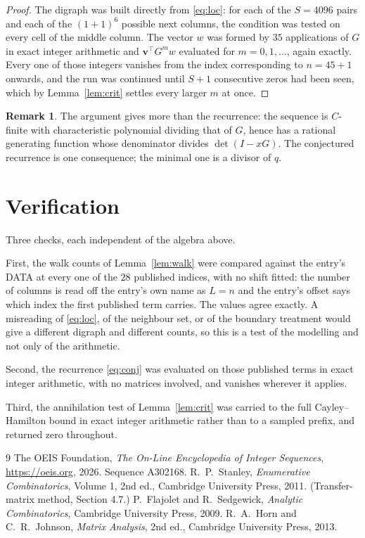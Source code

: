 \documentclass[11pt,a4paper]{article}
\theoremstyle{plain}
\theoremstyle{definition}
\newtheorem{remark}[theorem]{Remark}
\begin{document}
\begin{proof}
The digraph was built directly from \eqref{eq:loc}: for each of the $S=4096$ pairs and each
of the $(1+1)^{6}$ possible next columns, the condition was tested on every cell of
the middle column. The vector $w$ was formed by $35$ applications of $G$ in exact integer
arithmetic and $\mathbf{v}^{\!\top}G^{m}w$ evaluated for $m=0,1,\dots$, again exactly.
Every one of those integers vanishes from the index corresponding to $n=45+1$ onwards,
and the run was continued until $S+1$ consecutive zeros had been seen, which by
Lemma~\ref{lem:crit} settles every larger $m$ at once.
\end{proof}

\begin{remark}
The argument gives more than the recurrence: the sequence is $C$-finite with characteristic
polynomial dividing that of $G$, hence has a rational generating function whose denominator
divides $\det(I-xG)$. The conjectured recurrence is one consequence; the minimal one is a
divisor of $q$.
\end{remark}

\section{Verification}

Three checks, each independent of the algebra above.

First, the walk counts of Lemma~\ref{lem:walk} were compared against the entry's DATA at
every one of the $28$ published indices, with no shift fitted: the number of columns is
read off the entry's own name as $L=n$ and the entry's offset says which index the first
published term carries. The values agree exactly. A misreading of \eqref{eq:loc}, of the
neighbour set, or of the boundary treatment would give a different digraph and different
counts, so this is a test of the modelling and not only of the arithmetic.

Second, the recurrence \eqref{eq:conj} was evaluated on those published terms in exact
integer arithmetic, with no matrices involved, and vanishes wherever it applies.

Third, the annihilation test of Lemma~\ref{lem:crit} was carried to the full
Cayley--Hamilton bound in exact integer arithmetic rather than to a sampled prefix, and
returned zero throughout.

\begin{thebibliography}{9}
 The OEIS Foundation, \emph{The On-Line Encyclopedia of Integer
Sequences}, \url{https://oeis.org}, 2026. Sequence A302168.
 R.~P.~Stanley, \emph{Enumerative Combinatorics}, Volume 1, 2nd ed.,
Cambridge University Press, 2011. (Transfer-matrix method, Section 4.7.)
 P.~Flajolet and R.~Sedgewick, \emph{Analytic Combinatorics}, Cambridge
University Press, 2009.
 R.~A.~Horn and C.~R.~Johnson, \emph{Matrix Analysis}, 2nd ed., Cambridge
University Press, 2013.
\end{thebibliography}
\end{document}
